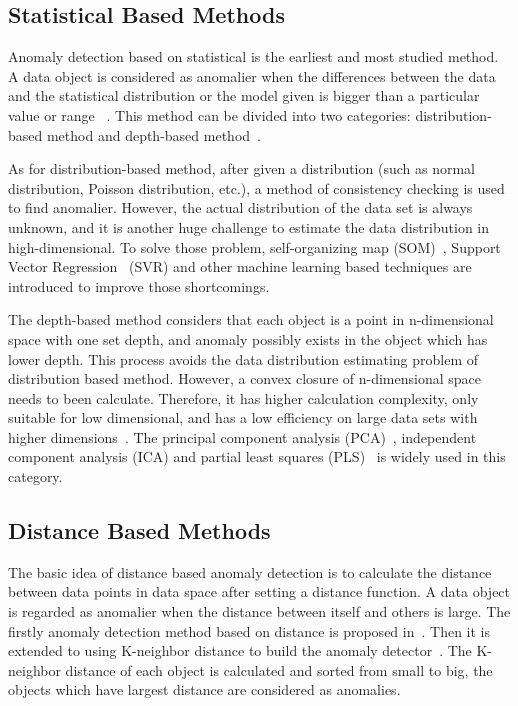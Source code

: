 \subsection{Statistical Based Methods}

Anomaly detection based on statistical is the earliest and
most studied method.
A data object is considered as anomalier when the differences
between the data and the statistical distribution or the model
given is bigger than a particular value or range ~\cite{chandola2009anomaly}.
This method can be divided into two
categories: distribution-based method and depth-based
method~\cite{wu2016survey}.

As for distribution-based method,
after given a distribution (such as
normal distribution,
Poisson distribution,
etc.), 
a method of consistency checking is used to find anomalier.
However,
the actual distribution of the data set is always unknown,
and it is another huge challenge to 
estimate the data distribution in high-dimensional. 
To solve those problem, 
self-organizing map (SOM)~\cite{siripanadorn2010anomaly}, 
Support Vector Regression~\cite{kromanis2013support} (SVR) and
other machine learning based techniques are introduced to
improve those shortcomings.

The depth-based method considers that
each object is a point in n-dimensional space
with one set depth,
and anomaly possibly exists in the object which has lower depth.
This process avoids the data distribution estimating problem of 
distribution based method.
However,
a convex closure of n-dimensional space needs to been calculate.
Therefore,
it has higher calculation complexity,
only suitable for low dimensional,
and has a low efficiency
on large data sets with higher dimensions~\cite{ruts1996computing}.
The principal component analysis (PCA)~\cite{deng2013modified}, 
independent component analysis (ICA) and 
partial least squares (PLS)~\cite{yin2014improved} is
widely used in this category.

\subsection{Distance Based Methods}

The basic idea of distance based anomaly detection
is to calculate the distance between data points in
data space after setting a distance function.
A data object is regarded as anomalier when 
the distance between  itself and others is large.
The firstly anomaly detection method 
based on distance is proposed in~\cite{knorr1997unified}.
Then it is extended to using K-neighbor distance to 
build the anomaly detector~\cite{ramaswamy2000efficient,kuang2008anomaly}.
The K-neighbor distance of each object is calculated and
sorted from small to big,
the objects which have largest
distance are considered as anomalies.

